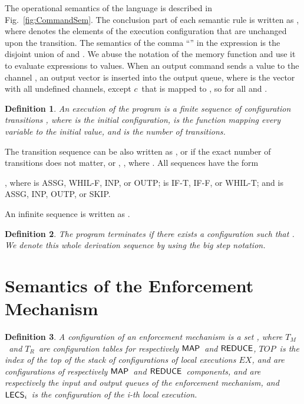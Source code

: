 \documentclass[10pt,a4paper,oneside]{article}
\newtheorem{definition}{Definition}[section]
\def\TAV{\ensuremath{T_{M}}}
\def\TPV{\ensuremath{T_{R}}}
\def\ST{{\ensuremath{EX}}}
\def\TOP{\ensuremath{TOP}}
\def\chnl{\ensuremath{c}}
\def\sanserif#1{\ensuremath{\sf #1}}
\def\REDUCE{\ensuremath{\sanserif{REDUCE}}}
\def\MAP{\ensuremath{\sanserif{MAP}}}
\def\RASSG{ASSG}
\def\RIFT{IF-T}
\def\RIFF{IF-F}
\def\RWHILET{WHIL-T}
\def\RWHILEF{WHIL-F}
\def\RSKIP{SKIP}
\def\RINPUT{INP}
\def\ROUTPUT{OUTP}
\def\LECS{{\sf \ensuremath{LECS}}}
\def\LECSI{\ensuremath{\LECS_{i}}}
\begin{document}
The operational semantics of the language is described in Fig.~\ref{fig:CommandSem}. The conclusion part of each semantic rule is written as , where  denotes the elements of the execution configuration that are unchanged upon the transition. The semantics of the comma ``'' in the expression  is the disjoint union of  and . We abuse the notation of the memory function  and use it to evaluate expressions to values. When an output command sends a value to the channel , an output vector  is inserted into the output queue, where  is the vector with all undefined channels, except \chnl\ that is mapped to , so  for all  and .

\begin{definition} \label{def:execution}
An \emph{execution} of the program  is a finite sequence of configuration transitions , where  is the initial configuration,  is the function mapping every variable to the initial value, and  is the number of transitions.
\end{definition}

The transition sequence can be also written as  , or  if the exact number of transitions does not matter, or ,   , where . All sequences have the form

, where   is \RASSG, \RWHILEF, \RINPUT, or \ROUTPUT;  is \RIFT, \RIFF, or \RWHILET; and  is \RASSG, \RINPUT, \ROUTPUT, or \RSKIP.



An infinite sequence is written as .

\begin{definition}\label{def:termination}
The program \emph{terminates} if there exists a configuration  such that . We denote this whole derivation sequence by  using the big step notation.
\end{definition}


\section{Semantics of the Enforcement Mechanism}\label{sec:formalization:em}
\begin{definition}\label{def:sem:global}
A \emph{configuration of an enforcement mechanism} is a set , where \TAV\ and \TPV\ are configuration tables for respectively \MAP\ and \REDUCE, \TOP\ is the index of the top of the stack of configurations of local executions \ST,  and  are configurations of respectively \MAP\ and \REDUCE\ components,  and  are respectively the input and output queues of the enforcement mechanism, and \LECSI\ is the configuration of the i-th local execution.
\end{definition}
\end{document}
